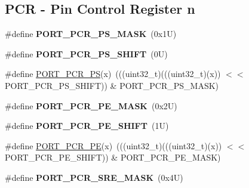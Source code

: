 \subsection*{P\+CR -\/ Pin Control Register n}
\begin{DoxyCompactItemize}
\item 
\mbox{\label{group___p_o_r_t___register___masks_ga075e53298ec26cb1b463c95b902c39c1}} 
\#define {\bfseries P\+O\+R\+T\+\_\+\+P\+C\+R\+\_\+\+P\+S\+\_\+\+M\+A\+SK}~(0x1\+U)
\item 
\mbox{\label{group___p_o_r_t___register___masks_ga7c040fa4d37750af5fef3ea1d0e370a9}} 
\#define {\bfseries P\+O\+R\+T\+\_\+\+P\+C\+R\+\_\+\+P\+S\+\_\+\+S\+H\+I\+FT}~(0\+U)
\item 
\#define \mbox{\hyperlink{group___p_o_r_t___register___masks_gabc7a02f49894ead35ce5d435bd05fb47}{P\+O\+R\+T\+\_\+\+P\+C\+R\+\_\+\+PS}}(x)~(((uint32\+\_\+t)(((uint32\+\_\+t)(x)) $<$$<$ P\+O\+R\+T\+\_\+\+P\+C\+R\+\_\+\+P\+S\+\_\+\+S\+H\+I\+FT)) \& P\+O\+R\+T\+\_\+\+P\+C\+R\+\_\+\+P\+S\+\_\+\+M\+A\+SK)
\item 
\mbox{\label{group___p_o_r_t___register___masks_ga125482aa2497e8435dac49c039b7fa97}} 
\#define {\bfseries P\+O\+R\+T\+\_\+\+P\+C\+R\+\_\+\+P\+E\+\_\+\+M\+A\+SK}~(0x2\+U)
\item 
\mbox{\label{group___p_o_r_t___register___masks_ga18556773988cdd78e363959884dbec46}} 
\#define {\bfseries P\+O\+R\+T\+\_\+\+P\+C\+R\+\_\+\+P\+E\+\_\+\+S\+H\+I\+FT}~(1\+U)
\item 
\#define \mbox{\hyperlink{group___p_o_r_t___register___masks_gaa149bd9cd83aa17c213a827f9482a913}{P\+O\+R\+T\+\_\+\+P\+C\+R\+\_\+\+PE}}(x)~(((uint32\+\_\+t)(((uint32\+\_\+t)(x)) $<$$<$ P\+O\+R\+T\+\_\+\+P\+C\+R\+\_\+\+P\+E\+\_\+\+S\+H\+I\+FT)) \& P\+O\+R\+T\+\_\+\+P\+C\+R\+\_\+\+P\+E\+\_\+\+M\+A\+SK)
\item 
\mbox{\label{group___p_o_r_t___register___masks_ga9cdf02a7b160ee528de8e18aad2cae60}} 
\#define {\bfseries P\+O\+R\+T\+\_\+\+P\+C\+R\+\_\+\+S\+R\+E\+\_\+\+M\+A\+SK}~(0x4\+U)
\item 
\mbox{\label{group___p_o_r_t___register___masks_ga87657ecdc18eb5b344d4e399a3a2fb70}} 

\end{DoxyCompactItemize}
